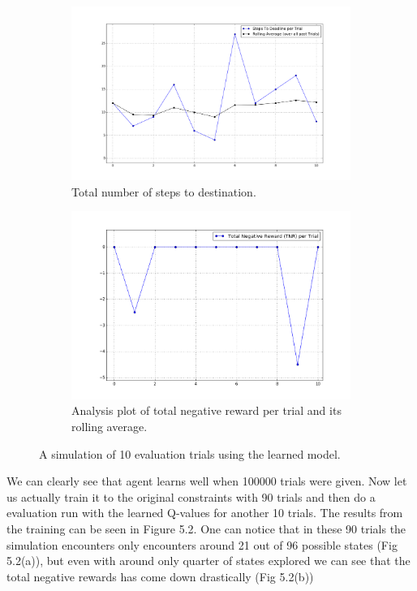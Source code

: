 \documentclass[paper=a4, fontsize=11pt]{scrartcl}
\numberwithin{equation}{section}		%
\numberwithin{figure}{section}			%
\numberwithin{table}{section}				%
\begin{document}
\begin{figure}
	\centering
	\begin{subfigure}{.5\textwidth}
		\centering
		\includegraphics[width= \linewidth]{5_STEPS_10}
		\caption{Total number of steps to destination.}
		\label{fig:sub1}
	\end{subfigure}%
	\begin{subfigure}{.5\textwidth}
		\centering
		\includegraphics[width= \linewidth]{5_TNR_10}
		\caption{Analysis plot of total negative reward per trial and its rolling average.}
		\label{fig:sub2}
	\end{subfigure}
	\caption{A simulation of 10 evaluation trials using the learned model. }
	\label{fig:test}
\end{figure}

We can clearly see that agent learns well when 100000 trials were given. Now let us actually train it to the original constraints with 90 trials and then do a evaluation run with the learned Q-values for another 10 trials. The results from the training can be seen in Figure 5.2. One can notice that in these 90 trials the simulation encounters only encounters around 21 out of 96 possible states (Fig 5.2(a)), but even with around only quarter of states explored we can see that the total negative rewards has come down drastically (Fig 5.2(b))
\end{document}
